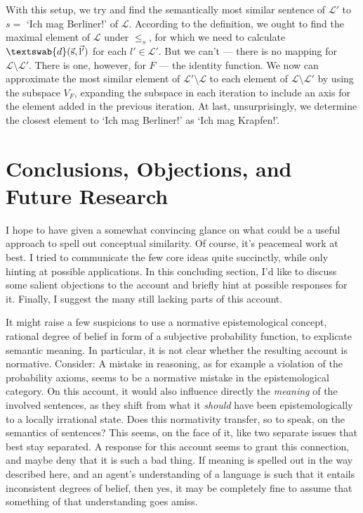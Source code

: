 \documentclass[11pt, a4paper]{scrartcl}
\renewcommand{\i}[1]{\emph{#1}}
\renewcommand{\L}{\mathcal{L}}
\renewcommand{\v}[1]{\vec{\mathrm{#1}}}
\newcommand{\m}[1]{\textswab{#1}}
\begin{document}
With this setup, we try and find the semantically most similar sentence of $\L'$ to $s =$ `Ich mag Berliner!' of $\L$. According to the definition, we ought to find the maximal element of $\L$ under $\leqslant_s$, for which we need to calculate $\m{d}(\v{s},\v{l'})$ for each $l' \in \L'$. But we can't --- there is no mapping for $\L\setminus\L'$. There is one, however, for $F$ --- the identity function. We now can approximate the most similar element of $\L'\setminus\L$ to each element of $\L\setminus\L'$ by using the subspace $V_F$, expanding the subspace in each iteration to include an axis for the element added in the previous iteration. At last, unsurprisingly, we determine the closest element to `Ich mag Berliner!' as `Ich mag Krapfen!'. 

\section{Conclusions, Objections, and Future Research}

I hope to have given a somewhat convincing glance on what could be a useful approach to spell out conceptual similarity. Of course, it's peacemeal work at best. I tried to communicate the few core ideas quite succinctly, while only hinting at possible applications. In this concluding section, I'd like to discuss some salient objections to the account and briefly hint at possible responses for it. Finally, I suggest the many still lacking parts of this account.

It might raise a few suspicions to use a normative epistemological concept, rational degree of belief in form of a subjective probability function, to explicate semantic meaning. In particular, it is not clear whether the resulting account is normative. Consider: A mistake in reasoning, as for example a violation of the probability axioms, seems to be a normative mistake in the epistemological category. On this account, it would also influence directly the \i{meaning} of the involved sentences, as they shift from what it \i{should} have been epistemologically to a locally irrational state. Does this normativity transfer, so to speak, on the semantics of sentences? This seems, on the face of it, like two separate issues that best stay separated. A response for this account seems to grant this connection, and maybe deny that it is such a bad thing. If meaning is spelled out in the way described here, and an agent's understanding of a language is such that it entails inconsistent degrees of belief, then yes, it may be completely fine to assume that something of that understanding goes amiss. 
\end{document}
